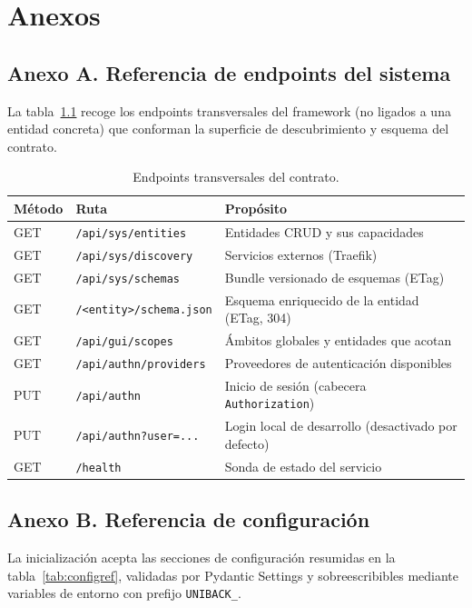 \chapter{Anexos}

\section{Anexo A. Referencia de endpoints del sistema}
La tabla~\ref{tab:apiref} recoge los endpoints transversales del framework
(no ligados a una entidad concreta) que conforman la superficie de
descubrimiento y esquema del contrato.

\begin{table}[!htbp]
\caption{Endpoints transversales del contrato.}
\label{tab:apiref}
\centering
\begin{tabular}{|l|l|p{6cm}|}
\hline
\textbf{Método} & \textbf{Ruta} & \textbf{Propósito} \\ \hline
GET & \texttt{/api/sys/entities} & Entidades CRUD y sus capacidades \\ \hline
GET & \texttt{/api/sys/discovery} & Servicios externos (Traefik) \\ \hline
GET & \texttt{/api/sys/schemas} & Bundle versionado de esquemas (ETag) \\ \hline
GET & \texttt{/<entity>/schema.json} & Esquema enriquecido de la entidad
(ETag, 304) \\ \hline
GET & \texttt{/api/gui/scopes} & Ámbitos globales y entidades que acotan \\ \hline
GET & \texttt{/api/authn/providers} & Proveedores de autenticación disponibles \\ \hline
PUT & \texttt{/api/authn} & Inicio de sesión (cabecera \texttt{Authorization}) \\ \hline
PUT & \texttt{/api/authn?user=...} & Login local de desarrollo (desactivado por defecto) \\ \hline
GET & \texttt{/health} & Sonda de estado del servicio \\ \hline
\end{tabular}
\end{table}

\section{Anexo B. Referencia de configuración}
La inicialización acepta las secciones de configuración resumidas en la
tabla~\ref{tab:configref}, validadas por Pydantic Settings y sobreescribibles
mediante variables de entorno con prefijo \texttt{UNIBACK\_}.

